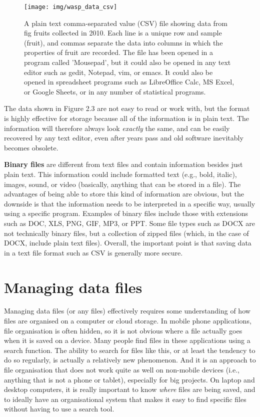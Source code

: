 \documentclass[
  openany]{scrbook}
\begin{document}
\begin{figure}
\texttt{[image: img/wasp\_data\_csv]} \caption{A plain text comma-separated value (CSV) file showing data from fig fruits collected in 2010. Each line is a unique row and sample (fruit), and commas separate the data into columns in which the properties of fruit are recorded. The file has been opened in a program called 'Mousepad', but it could also be opened in any text editor such as gedit, Notepad, vim, or emacs. It could also be opened in spreadsheet programs such as LibreOffice Calc, MS Excel, or Google Sheets, or in any number of statistical programs.}\label{fig:unnamed-chunk-5}
\end{figure}

The data shown in Figure 2.3 are not easy to read or work with, but the format is highly effective for storage because all of the information is in plain text.
The information will therefore always look \emph{exactly} the same, and can be easily recovered by any text editor, even after years pass and old software inevitably becomes obsolete.

\textbf{Binary files} are different from text files and contain information besides just plain text.
This information could include formatted text (e.g., bold, italic), images, sound, or video (basically, anything that can be stored in a file).
The advantages of being able to store this kind of information are obvious, but the downside is that the information needs to be interpreted in a specific way, usually using a specific program.
Examples of binary files include those with extensions such as DOC, XLS, PNG, GIF, MP3, or PPT.
Some file types such as DOCX are not technically binary files, but a collection of zipped files (which, in the case of DOCX, include plain text files).
Overall, the important point is that saving data in a text file format such as CSV is generally more secure.

\hypertarget{managing-data-files}{%
\section{Managing data files}\label{managing-data-files}}

Managing data files (or any files) effectively requires some understanding of how files are organised on a computer or cloud storage.
In mobile phone applications, file organisation is often hidden, so it is not obvious where a file actually goes when it is saved on a device.
Many people find files in these applications using a search function.
The ability to search for files like this, or at least the tendency to do so regularly, is actually a relatively new phenomenon.
And it is an approach to file organisation that does not work quite as well on non-mobile devices (i.e., anything that is not a phone or tablet), especially for big projects.
On laptop and desktop computers, it is really important to know \emph{where} files are being saved, and to ideally have an organisational system that makes it easy to find specific files without having to use a search tool.
\end{document}
